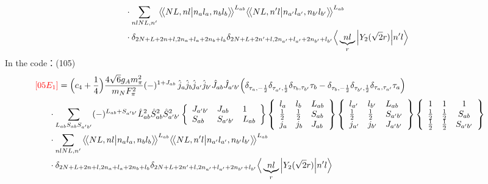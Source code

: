 \documentclass[master]{shnuthesis}
\newcommand{\llangle}{\big\langle\!\big\langle}
\newcommand{\rrangle}{\big\rangle\!\big\rangle}
\newcommand{\ap}{a^\prime}
\newcommand{\bp}{b^\prime}
\newcommand{\il}{\!\!\!\!\!\!\!\!\!\!}
\begin{document}
\begin{align}
    & \cdot \sum_{nlNL,n^\prime} \llangle N L, n l \big| n_{a} l_{a}, n_{b} l_{b} \rrangle^{L_{ab}} \llangle N L, n^\prime l \big| n_{a^\prime} l_{a^\prime}, n_{b^\prime} l_{b^\prime} \rrangle^{L_{ab}} \notag\\
    & \cdot \delta_{2N+L+2n+l,2n_a+l_a+2n_b+l_b}\delta_{2N+L+2n^\prime+l,2n_{a^\prime}+l_{a^\prime}+2n_{b^\prime}+l_{b^\prime}}  \Big\langle \underbrace{n l}_{r} \Big| Y_2(\sqrt{2}r) \Big| n^\prime l \Big\rangle
\end{align}
In the code：(105)
\begin{align}
    &\il {\color{red} [05E_1]} = \Big(c_4+\frac{1}{4}\Big)\frac{4\sqrt{6}g_A m_\pi^2}{m_N F_\pi^2} (-)^{1+J_{ab}}\,\hat{j}_a\hat{j}_b\hat{j}_{\ap}\hat{j}_{\bp}\hat{J}_{ab}\hat{J}_{\ap\bp} \Big( \delta_{\tau_a,-\frac{1}{2}}\delta_{\tau_{\ap},\frac{1}{2}}\delta_{\tau_b,\tau_{\bp}}\tau_b - \delta_{\tau_b,-\frac{1}{2}}\delta_{\tau_{\bp},\frac{1}{2}}\delta_{\tau_a,\tau_{\ap}}\tau_a \Big) \notag\\
    & \cdot \sum_{L_{ab}S_{ab}S_{\ap\bp}} (-)^{L_{ab}+S_{\ap\bp}} \hat{L}_{ab}^2\hat{S}_{ab}^2\hat{S}_{\ap\bp}^2  \left\{\begin{array}{lll} J_{\ap\bp} & J_{ab} & 1 \\ S_{ab} & S_{\ap\bp} & L_{ab} \end{array}\right\}  \left\{\begin{array}{lll}l_{a} & l_{b} & L_{ab} \\ \frac{1}{2} & \frac{1}{2} & S_{ab} \\j_{a} & j_{b} & J_{ab} \end{array}\right\} \left\{\begin{array}{lll}l_{\ap} & l_{\bp} & L_{ab} \\ \frac{1}{2} & \frac{1}{2} & S_{\ap\bp} \\j_{\ap} & j_{\bp} & J_{\ap\bp} \end{array}\right\}  \left\{\begin{array}{ccc} 1 & 1 & 1 \\ \frac{1}{2} & \frac{1}{2} & S_{ab} \\ \frac{1}{2} & \frac{1}{2} & S_{\ap\bp} \end{array}\right\}  \notag \\
    & \cdot \sum_{nlNL,n^\prime} \llangle N L, n l \big| n_{a} l_{a}, n_{b} l_{b} \rrangle^{L_{ab}} \llangle N L, n^\prime l \big| n_{a^\prime} l_{a^\prime}, n_{b^\prime} l_{b^\prime} \rrangle^{L_{ab}} \notag\\
    & \cdot \delta_{2N+L+2n+l,2n_a+l_a+2n_b+l_b}\delta_{2N+L+2n^\prime+l,2n_{a^\prime}+l_{a^\prime}+2n_{b^\prime}+l_{b^\prime}}  \Big\langle \underbrace{n l}_{r} \Big| Y_2(\sqrt{2}r) \Big| n^\prime l \Big\rangle
\end{align}
\end{document}
